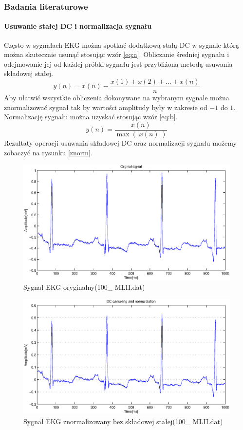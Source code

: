 \documentclass[a4paper, 11pt]{article}
\begin{document}
\subsubsection{Badania literaturowe}
\label{sec:rs:papers}


\paragraph{Usuwanie stałej DC i normalizacja sygnału}
Często w sygnałach EKG można spotkać dodatkową stałą DC w sygnale którą można skutecznie usunąć stosując wzór
\eqref{eq:a}. Obliczanie średniej sygnału i odejmowanie jej od każdej próbki sygnału jest przybliżoną metodą usuwania składowej stałej.
\begin{equation}
y(n) = x(n)-\frac{x(1)+x(2)+...+x(n)}{n} \label{eq:a}
\end{equation}
\indent Aby ułatwić wszystkie obliczenia dokonywane na wybranym sygnale można znormalizować sygnał tak by wartości amplitudy były w zakresie od $-1$ do $1$. Normalizację sygnału można uzyskać stosując wzór \eqref{eq:b}.
\begin{equation}
y(n) = \frac{x(n)}{\max(|x(n)|)} \label{eq:b} 
\end{equation}
\indent Rezultaty operacji usuwania składowej DC oraz normalizacji sygnału możemy zobaczyć na rysunku \eqref{znorm}.
\begin{figure}[h]
\centering
\includegraphics[scale=0.5]{include/surowy.eps}
\caption{Sygnał EKG oryginalny(100\_ MLII.dat)}
\label{surowy}
\end{figure}
\begin{figure}[h]
\centering
\includegraphics[scale=0.5]{include/znormalizowany.eps}
\caption{Sygnał EKG znormalizowany bez składowej stałej(100\_ MLII.dat)}
\label{znorm}
\end{figure}
\end{document}
